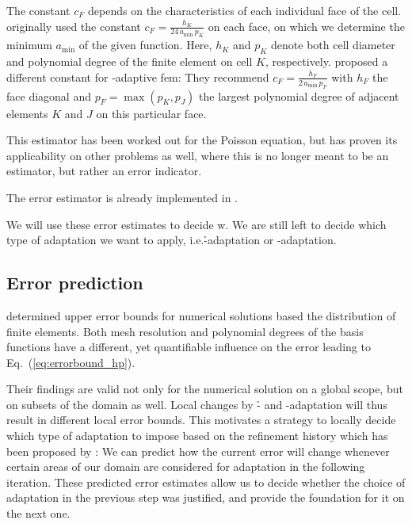 The constant $c_F$ depends on the characteristics of each individual face of the cell. \textcite{kelly1983} originally used the constant $c_F = \frac{h_K}{24 \, a_\text{min} \, p_K}$ on each face, on which we determine the minimum $a_\text{min}$ of the given function. Here, $h_K$ and $p_K$ denote both cell diameter and polynomial degree of the finite element on cell $K$, respectively. \textcite{davydov2017} proposed a different constant for \hp-adaptive \gls{fem}: They recommend $c_F = \frac{h_F}{2 \, a_\text{min} \, p_F}$ with $h_F$ the face diagonal and $p_F = \max\left(p_K, p_J\right)$ the largest polynomial degree of adjacent elements $K$ and $J$ on this particular face.

This estimator has been worked out for the Poisson equation, but has proven its applicability on other problems as well, where this is no longer meant to be an estimator, but rather an error indicator.

The error estimator is already implemented in \dealii{}. 

We will use these error estimates to decide w. We are still left to decide which type of adaptation we want to apply, i.e.\@ \h-adaptation or \p-adaptation.



\subsection{Error prediction}
\label{ssec:prediction}

\cite{babuska1990} determined upper error bounds for numerical solutions based the distribution of finite elements. Both mesh resolution and polynomial degrees of the basis functions have a different, yet quantifiable influence on the error leading to Eq.~(\ref{eq:errorbound_hp}).

Their findings are valid not only for the numerical solution on a global scope, but on subsets of the domain as well. Local changes by \h- and \p-adaptation will thus result in different local error bounds. This motivates a strategy to locally decide which type of adaptation to impose based on the refinement history which has been proposed by \textcite{melenk2001}: We can predict how the current error will change whenever certain areas of our domain are considered for adaptation in the following iteration. These predicted error estimates allow us to decide whether the choice of adaptation in the previous step was justified, and provide the foundation for it on the next one.

